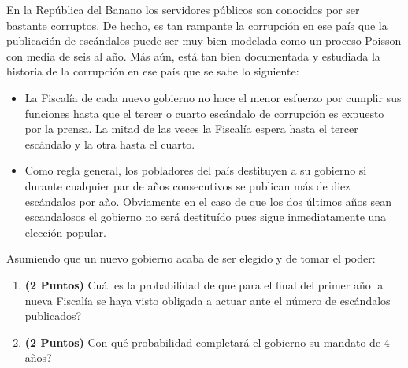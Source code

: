 \documentclass[ a4paper, twoside, 11pt]{article}
\begin{document}
\begin{problem}
En la Rep\'ublica del Banano los servidores p\'ublicos son conocidos por ser bastante corruptos. De hecho, es tan rampante la corrupci\'on en ese pa\'is que la publicaci\'on de esc\'andalos puede ser muy bien modelada como un proceso Poisson con media de seis al a\~no. M\'as a\'un, est\'a tan bien documentada y estudiada la historia de la corrupci\'on en ese pa\'is que se sabe lo siguiente: 
\begin{itemize}
\item La Fiscal\'ia de cada nuevo gobierno no hace el menor esfuerzo por cumplir sus funciones hasta que el tercer o cuarto esc\'andalo de corrupci\'on es expuesto por la prensa. La mitad de las veces la Fiscal\'ia espera hasta el tercer esc\'andalo y la otra hasta el cuarto. 
\item Como regla general, los pobladores del pa\'is destituyen a su gobierno si durante cualquier par de a\~nos consecutivos se publican m\'as de diez esc\'andalos por a\~no. Obviamente en el caso de que los dos \'ultimos a\~nos sean escandalosos el gobierno no ser\'a destitu\'ido pues sigue inmediatamente una elecci\'on popular. 
\end{itemize}

Asumiendo que un nuevo gobierno acaba de ser elegido y de tomar el poder: 
\begin{enumerate}[label=\alph*)]
\item \textbf{(2 Puntos)} Cu\'al es la probabilidad de que para el final del primer a\~no la nueva Fiscal\'ia se haya visto obligada a actuar ante el n\'umero de esc\'andalos publicados?
\item \textbf{(2 Puntos)} Con qu\'e probabilidad completar\'a el gobierno su mandato de 4 a\~nos?
\end{enumerate}

\end{problem}
\vspace{\baselineskip}
\end{document}

